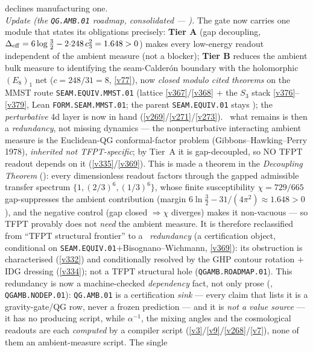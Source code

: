 \begin{keybox}
declines manufacturing one.
\smallskip\\
\noindent\emph{Update (the \texttt{QG.AMB.01} roadmap, consolidated --- ).} The
gate now carries one module that states its obligations precisely: \textbf{Tier A} (gap decoupling,
$\Delta_{\mathrm{eff}}=6\log\tfrac32-2{\cdot}248\,c_3^2=1.648>0$) makes every low-energy readout independent of
the ambient measure (not a blocker); \textbf{Tier B} reduces the ambient bulk measure to identifying the
seam-Calder\'on boundary with the holomorphic $(E_8)_1$ net ($c{=}248/31{=}8$, \vref{v77}), now \emph{closed modulo
cited theorems} on the MMST route \texttt{SEAM.EQUIV.MMST.01} (lattice \vref{v367}/\vref{v368} $+$ the $S_3$ stack
\vref{v376}--\vref{v379}, Lean
\texttt{FORM.SEAM.MMST.01}; the parent \texttt{SEAM.EQUIV.01} stays \mO);
the \emph{perturbative} 4d layer is now in hand (\vref{v269}/\vref{v271}/\vref{v273}). \mC\ what remains is then a
\emph{redundancy}, not missing dynamics --- the nonperturbative interacting ambient measure is the Euclidean-QG
conformal-factor problem (Gibbons--Hawking--Perry 1978), \emph{inherited not TFPT-specific}; by Tier~A it is
gap-decoupled, so NO TFPT readout depends on it (\vref{v335}/\vref{v369}).  This is made a theorem in the
\emph{Decoupling Theorem} (): every dimensionless readout factors through the
gapped admissible transfer spectrum $\{1,(2/3)^6,(1/3)^6\}$, whose finite susceptibility $\chi=729/665$
gap-suppresses the ambient contribution (margin $6\ln\tfrac32-31/(4\pi^2)\approx1.648>0$), and the negative control
(gap closed $\Rightarrow \chi$ diverges) makes it non-vacuous --- so TFPT provably does not \emph{need} the ambient
measure.  It is therefore reclassified from ``TFPT structural frontier'' to a \mC\ \emph{redundancy} (a certification
object, conditional on \texttt{SEAM.EQUIV.01}${+}$Bisognano--Wichmann, \vref{v369}): its obstruction is characterised
(\vref{v332}) and conditionally resolved by the GHP contour rotation $+$ IDG dressing (\vref{v334}); not a TFPT
structural hole (\texttt{QGAMB.ROADMAP.01}).
This redundancy is now a machine-checked \emph{dependency} fact, not only prose
(, \texttt{QGAMB.NODEP.01}): \texttt{QG.AMB.01} is a
certification \emph{sink} --- every claim that lists it is a gravity-gate/QG row, never a frozen
prediction --- and it is \emph{not a value source} --- it has no producing script, while $\alpha^{-1}$,
the mixing angles and the cosmological readouts are each \emph{computed} by a compiler script
(\vref{v3}/\vref{v9}/\vref{v268}/\vref{v7}), none of them an ambient-measure script. The single

\end{keybox}
